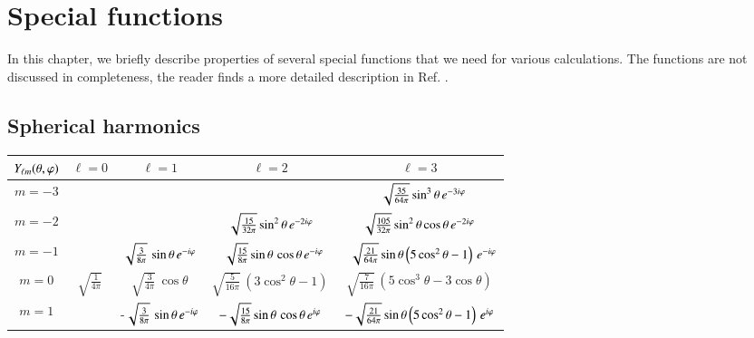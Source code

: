 \appendix

\chapter{Special functions}

In this chapter, we briefly describe properties of several special functions
that we need for various calculations. The functions are not discussed in
completeness, the reader finds a more detailed description in Ref.
\cite{abramowitz}.

\section{Spherical harmonics}
\label{appendix_sfunc_spherical_harmonics}

\begin{table}[t]
\begin{center}
\begin{tabular}{|c|c|c|c|c|}
\hline
$Y_{\ell m}(\theta,\varphi)$ & $\ell=0$                & $\ell=1$                              & $\ell=2$                                         & $\ell=3$ \\
\hline
$m=-3$     &                         &                                    &                                               & $\phantom{-}\sqrt{\tfrac{35}{64 \pi}} \sin^{3}{\theta}\,e^{-3i\varphi}$ \\
\hline
$m=-2$     &                         &                                    & $\sqrt{\tfrac{15}{32 \pi}} \sin^{2}{\theta} \, e^{-2i \varphi}$ & $\sqrt{\tfrac{105}{32\pi}} \sin^{2}{\theta}\cos{\theta}\,e^{-2i\varphi}$ \\
\hline
$m=-1$     &                         & $\sqrt{\tfrac{3}{8\pi}} \, \sin\theta \, e^{-i\varphi}$    & $\phantom{-}\sqrt{\tfrac{15}{8 \pi}} \sin{\theta} \, \cos{\theta} \, e^{-i\varphi}$ & $\phantom{-}\sqrt{\tfrac{21}{64 \pi}} \sin{\theta}\left(5 \cos^{2}{\theta} - 1\right)\,e^{-i \varphi}$ \\
\hline
$m=0$      & $\sqrt{\tfrac{1}{4\pi}}$ & $\sqrt{\tfrac{3}{4\pi}} \, \cos\theta$ & $\sqrt{\tfrac{5}{16\pi}} \, (3\cos^2\theta-1)$ & $\sqrt{\frac{7}{16\pi}} \, (5\cos^3\theta-3\cos\theta)$ \\
\hline
$m=1$      &                         & -$\sqrt{\tfrac{3}{8\pi}} \, \sin\theta \, e^{-i\varphi}$ & $-\sqrt{\tfrac{15}{8 \pi}} \sin{\theta} \, \cos{\theta} \, e^{i \varphi}$ & $-\sqrt{\tfrac{21}{64\pi}} \sin{\theta}\left( 5 \cos^{2}{\theta} - 1\right)\,e^{i \varphi}$ \\

\end{tabular}
\end{center}
\end{table}
